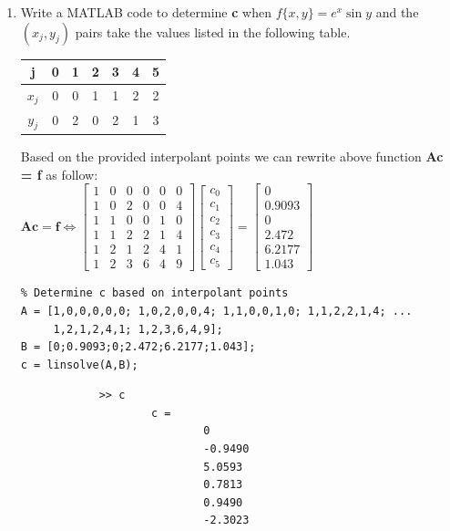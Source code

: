 \documentclass[14pt,a4paper]{article}
\begin{document}
\begin{enumerate}
		
		\item Write a MATLAB code to determine \textbf{c} when $f\{x,y\} = e^x\sin y$ and the $(x_j,y_j)$ pairs take the values listed in the following table.
			\begin{center}
				\begin{tabular} {| c | c | c | c | c | c | c |}
					 \hline
					j & 0 &1 &2 &3 &4 &5 \\
					\hline
					$x_j$ & 0& 0&1&1&2&2 \\
					\hline
					$y_j$ & 0&2&0&2&1&3\\
					\hline
				\end{tabular}
			\end{center}
		Based on the provided interpolant points we can rewrite above function \textbf{Ac = f} as follow: \\
		\hspace*{2cm} $\textbf{Ac} = \textbf{f} \Leftrightarrow \begin{bmatrix} 1&0&0&0&0&0 \\ 1&0&2&0&0&4 \\ 1&1&0&0&1&0 \\ 1&1&2&2&1&4 \\ 1&2&1&2&4&1 \\ 1&2&3&6&4&9 \end{bmatrix} \begin{bmatrix} c_0\\c_1\\c_2\\c_3\\c_4\\c_5 \end{bmatrix} = \begin{bmatrix} 0 \\ 0.9093 \\ 0 \\ 2.472 \\ 6.2177 \\ 1.043 \end{bmatrix} $ \\
		\begin{lstlisting}
% Determine c based on interpolant points
A = [1,0,0,0,0,0; 1,0,2,0,0,4; 1,1,0,0,1,0; 1,1,2,2,1,4; ... 
     1,2,1,2,4,1; 1,2,3,6,4,9];
B = [0;0.9093;0;2.472;6.2177;1.043];
c = linsolve(A,B);
		\end{lstlisting}
		\begin{lstlisting}
			>> c
					c =
							0
							-0.9490
							5.0593
							0.7813
							0.9490
							-2.3023
		\end{lstlisting}
		

\end{enumerate}
\end{document}
